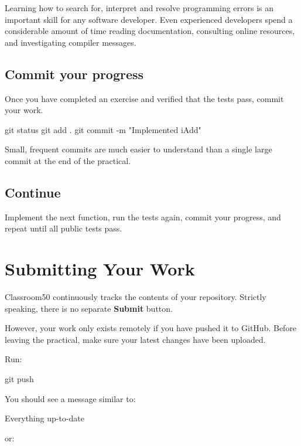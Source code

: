 \documentclass{csc2059practical}
\begin{document}
\begin{tipbox}
Learning how to search for, interpret and resolve programming errors is an important skill for any software developer. Even experienced developers spend a considerable amount of time reading documentation, consulting online resources, and investigating compiler messages.
\end{tipbox}

\subsection{Commit your progress}

Once you have completed an exercise and verified that the tests pass, commit your work.

\begin{bashcode}
git status
git add .
git commit -m "Implemented iAdd"
\end{bashcode}

Small, frequent commits are much easier to understand than a single large commit at the end of the practical.

\subsection{Continue}

Implement the next function, run the tests again, commit your progress, and repeat until all public tests pass.

\section{Submitting Your Work}

Classroom50 continuously tracks the contents of your repository. Strictly speaking, there is no separate \textbf{Submit} button.

However, your work only exists remotely if you have pushed it to GitHub. Before leaving the practical, make sure your latest changes have been uploaded.

Run:

\begin{bashcode}
git push
\end{bashcode}

You should see a message similar to:

\begin{terminal}
Everything up-to-date
\end{terminal}

or:
\end{document}

